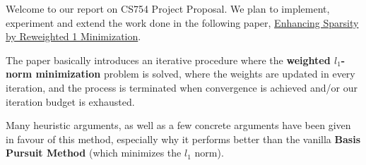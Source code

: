 \documentclass[a4paper,11pt]{article}
\numberwithin{definition}{section}
\numberwithin{mytheorem}{subsection}
\begin{document}

\date{Spring 2022}
\maketitle

\justifying

\justifying

Welcome  to our report on CS754 Project Proposal. We plan to implement, experiment and extend the work done in the following paper, \href{https://web.stanford.edu/~boyd/papers/pdf/rwl1.pdf}{Enhancing Sparsity by Reweighted 1 Minimization}.

The paper basically introduces an iterative procedure where the \textbf{weighted $l_1$-norm minimization} problem is solved, where the weights are updated in every iteration, and the process is terminated when convergence is achieved and/or our iteration budget is exhausted.

Many heuristic arguments, as well as a few concrete arguments have been given in favour of this method, especially why it performs better than the vanilla \textbf{Basis Pursuit Method} (which minimizes the $l_1$ norm). 
\end{document}
